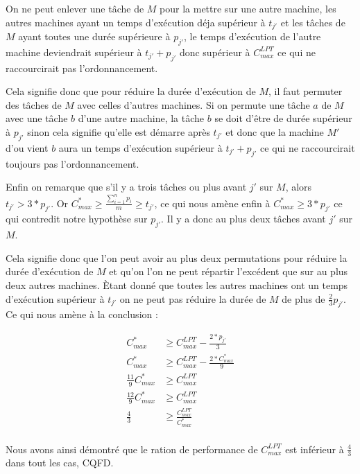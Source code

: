 On ne peut enlever une tâche de $M$ pour la mettre sur une autre machine, les 
autres machines ayant un temps d'exécution déja supérieur à $t_{j'}$ et les 
tâches de $M$ ayant toutes une durée supérieure à $p_{j'}$, le temps d'exécution 
de l'autre machine deviendrait supérieur à $t_{j'}+p_{j'}$ donc supérieur 
à $C^{LPT}_{max}$ ce qui ne raccourcirait pas l'ordonnancement.

Cela signifie donc que pour réduire la durée d'exécution de $M$, il faut 
permuter des tâches de $M$ avec celles d'autres machines. Si on permute une 
tâche $a$ de $M$ avec une tâche $b$ d'une autre machine, la tâche $b$ se doit 
d'être de durée supérieur à $p_{j'}$ sinon cela signifie qu'elle est démarre 
après $t_{j'}$ et donc que la machine $M'$ d'ou vient $b$ aura un temps 
d'exécution supérieur à $t_{j'}+p_{j'}$ ce qui ne raccourcirait toujours pas 
l'ordonnancement.

Enfin on remarque que s'il y a trois tâches ou plus avant $j'$ sur $M$, alors 
$t_{j'} > 3*p_{j'}$. Or $C^*_{max} \geq \frac{\sum_{i=1}^n p_{i}}{m} \geq 
t_{j'}$, ce qui nous amène enfin à $C^*_{max} \geq 3*p_{j'}$ ce qui contredit 
notre hypothèse sur $p_{j'}$.  Il y a donc au plus deux tâches avant $j'$ sur 
$M$.

Cela signifie donc que l'on peut avoir au plus deux permutations pour réduire la 
durée d'exécution de $M$ et qu'on l'on ne peut répartir l'excédent que sur au 
plus deux autres machines. Ètant donné que toutes les autres machines ont un 
temps d'exécution supérieur à $t_{j'}$ on ne peut pas réduire la durée de $M$ de 
plus de $\frac{2}{3}p_{j'}$. Ce qui nous amène à la conclusion :

\begin{align}
C^*_{max} &\geq C^{LPT}_{max} - \frac{2*p_{j'}}{3} \\
C^*_{max} &\geq C^{LPT}_{max} - \frac{2*C^*_{max}}{9} \\
\frac{11}{9}C^*_{max} &\geq C^{LPT}_{max} \\
\frac{12}{9}C^*_{max} &\geq C^{LPT}_{max} \\
\frac{4}{3} &\geq \frac{C^{LPT}_{max}}{C^*_{max}} \\
\end{align}

Nous avons ainsi démontré que le ration de performance de $C^{LPT}_{max}$ est 
inférieur à $\frac{4}{3}$ dans tout les cas, CQFD.

